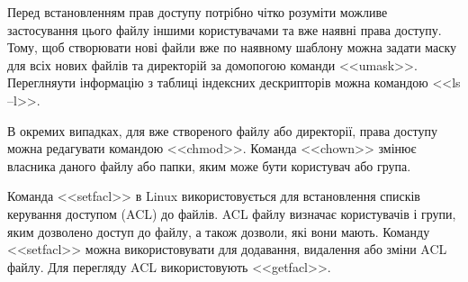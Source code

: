 \documentclass[a4paper,12pt]{article}
\begin{document}
    Перед встановленням прав доступу потрібно чітко розуміти можливе застосування цього файлу іншими користувачами та вже наявні права доступу.
    Тому, щоб створювати нові файли вже по наявному шаблону можна задати маску для всіх нових файлів та директорій за домопогою команди <<umask>>. 
    Переглняути інформацію з таблиці індексних дескрипторів можна командою <<ls –l>>. 

    В окремих випадках, для вже створеного файлу або директорії, права доступу можна редагувати командою <<chmod>>. 
    Команда <<chown>> змінює власника даного файлу або папки, яким може бути користувач або група. 

    Команда <<setfacl>> в Linux використовується для встановлення списків керування доступом (ACL) до файлів. 
    ACL файлу визначає користувачів і групи, яким дозволено доступ до файлу, а також дозволи, які вони мають. 
    Команду <<setfacl>> можна використовувати для додавання, видалення або зміни ACL файлу. Для перегляду ACL використовують <<getfacl>>.
\end{document}
